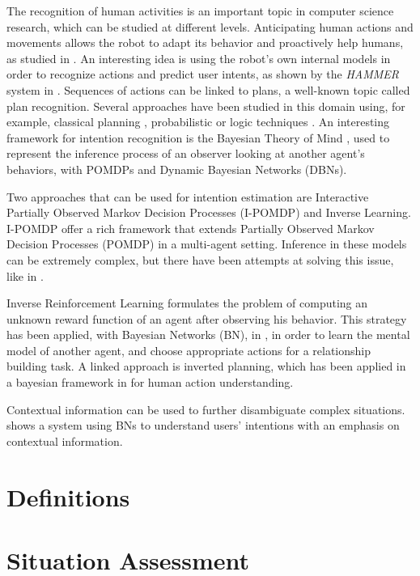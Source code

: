 The recognition of human activities is an important topic in computer science research, which can be studied at different levels. Anticipating human actions and movements allows the robot to adapt its behavior and proactively help humans, as studied in \cite{koppula2013anticipating}. An interesting idea is using the robot's own internal models in order to recognize actions and predict user intents, as shown by the \textit{HAMMER} system in \cite{demiris2007prediction}. Sequences of actions can be linked to plans, a well-known topic called plan recognition. Several approaches have been studied in this domain using, for example, classical planning \cite{ramirez2009plan}, probabilistic \cite{bui2003general} or logic techniques \cite{singla2011abductive}. An interesting framework for intention recognition is the Bayesian Theory of Mind \cite{baker2014modeling}, used to represent the inference process of an observer looking at another agent's behaviors, with POMDPs and Dynamic Bayesian Networks (DBNs). 

Two approaches that can be used for intention estimation are Interactive Partially Observed Markov Decision Processes (I-POMDP) and Inverse Learning. I-POMDP  \cite{gmytrasiewicz2004interactive} offer a rich framework that extends Partially Observed Markov Decision Processes (POMDP) in a multi-agent setting. Inference in these models can be extremely complex, but there have been attempts at solving this issue, like in \cite{doshi2009monte,hoang2013interactive}. 

Inverse Reinforcement Learning \cite{ng2000algorithms} formulates the problem of computing an unknown reward function of an agent after observing his behavior. This strategy has been applied, with Bayesian Networks (BN), in \cite{Nagai2015}, in order to learn the mental model of another agent, and choose appropriate actions for a relationship building task. A linked approach is inverted planning, which has been applied in a bayesian framework in \cite{baker2009action}  for human action understanding.

Contextual information can be used to further disambiguate complex situations. \cite{Liu2014} shows a system using BNs to understand users' intentions with an emphasis on contextual information.

\section{Definitions}


\section{Situation Assessment}
\label{situation_assessment-situation_assessment}
